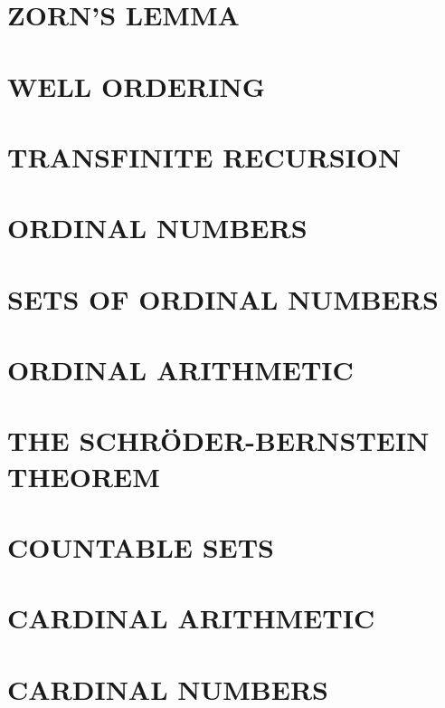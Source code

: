 \documentclass[11pt]{book}
\theoremstyle{axiom}
\theoremstyle{exc}
\begin{document}
\chapter{ZORN'S LEMMA}


\chapter{WELL ORDERING}


\chapter{TRANSFINITE RECURSION} 


\chapter{ORDINAL NUMBERS}


\chapter{SETS OF ORDINAL NUMBERS}


\chapter{ORDINAL ARITHMETIC}


\chapter{THE SCHRÖDER-BERNSTEIN THEOREM}


\chapter{COUNTABLE SETS}


\chapter{CARDINAL ARITHMETIC}


\chapter{CARDINAL NUMBERS}

\end{document}
